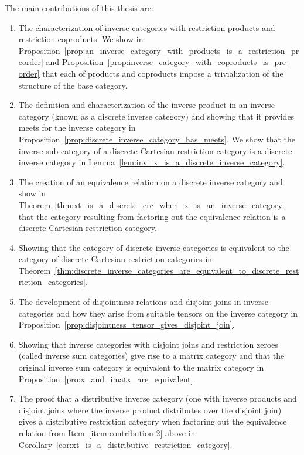 The main contributions of this thesis are:
\begin{enumerate}
\item The characterization of inverse categories with restriction products and restriction
  coproducts.  We show in
  Proposition~\ref{prop:an_inverse_category_with_products_is_a_restriction_preorder} and
  Proposition~\ref{prop:inverse_category_with_coproducts_is_pre-order} that each of products and
  coproducts impose a trivialization of the structure of the base category.

\item The definition and characterization of the inverse product in an inverse category (known as a
  discrete inverse category) and showing  that it provides meets for the inverse category  in
  Proposition~\ref{prop:discrete_inverse_category_has_meets}. We show that the inverse sub-category
  of a discrete Cartesian restriction category is a discrete inverse category in
  Lemma~\ref{lem:inv_x_is_a_discrete_inverse_category}.
\item The creation of an equivalence relation on a discrete inverse category and show in
  Theorem~\ref{thm:xt_is_a_discrete_crc_when_x_is_an_inverse_category} that the category resulting
  from factoring out the equivalence relation is a discrete Cartesian restriction
  category.\label{item:contribution-2}
\item Showing that the category of discrete inverse categories is equivalent to the category of
  discrete Cartesian restriction categories in
  Theorem~\ref{thm:discrete_inverse_categories_are_equivalent_to_discrete_restriction_categories}.
\item The development of disjointness relations and disjoint joins in inverse categories and how
  they arise from suitable tensors on the inverse category in
  Proposition~\ref{prop:disjointness_tensor_gives_disjoint_join}.
\item Showing that inverse categories with disjoint joins and restriction zeroes (called inverse sum
  categories) give rise to a matrix category and that the original inverse sum category is
  equivalent to the matrix category in Proposition~\ref{pro:x_and_imatx_are_equivalent}
\item The proof that a distributive inverse category (one with inverse products and disjoint joins
  where the inverse product distributes over the disjoint join) gives a distributive restriction
  category when factoring out the equivalence relation from Item~\ref{item:contribution-2} above in
  Corollary~\ref{cor:xt_is_a_distributive_restriction_category}.
\end{enumerate}

